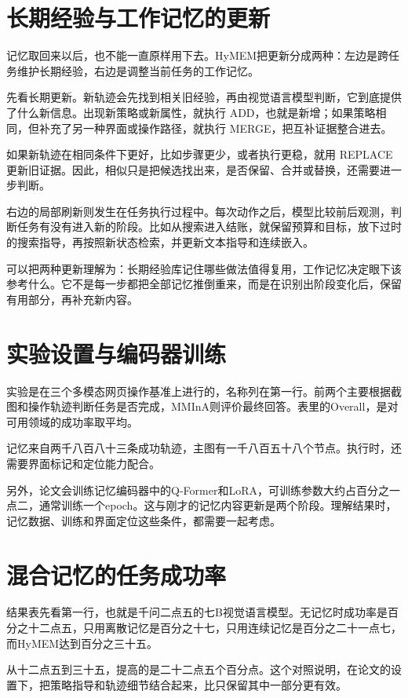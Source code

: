 \documentclass[UTF8,fontset=fandol]{ctexart}
\begin{document}
\section*{长期经验与工作记忆的更新}
记忆取回来以后，也不能一直原样用下去。HyMEM把更新分成两种：左边是跨任务维护长期经验，右边是调整当前任务的工作记忆。

先看长期更新。新轨迹会先找到相关旧经验，再由视觉语言模型判断，它到底提供了什么新信息。出现新策略或新属性，就执行 ADD，也就是新增；如果策略相同，但补充了另一种界面或操作路径，就执行 MERGE，把互补证据整合进去。

如果新轨迹在相同条件下更好，比如步骤更少，或者执行更稳，就用 REPLACE 更新旧证据。因此，相似只是把候选找出来，是否保留、合并或替换，还需要进一步判断。

右边的局部刷新则发生在任务执行过程中。每次动作之后，模型比较前后观测，判断任务有没有进入新的阶段。比如从搜索进入结账，就保留预算和目标，放下过时的搜索指导，再按照新状态检索，并更新文本指导和连续嵌入。

可以把两种更新理解为：长期经验库记住哪些做法值得复用，工作记忆决定眼下该参考什么。它不是每一步都把全部记忆推倒重来，而是在识别出阶段变化后，保留有用部分，再补充新内容。
\clearpage
{}
\section*{实验设置与编码器训练}
实验是在三个多模态网页操作基准上进行的，名称列在第一行。前两个主要根据截图和操作轨迹判断任务是否完成，MMInA则评价最终回答。表里的Overall，是对可用领域的成功率取平均。

记忆来自两千八百八十三条成功轨迹，主图有一千八百五十八个节点。执行时，还需要界面标记和定位能力配合。

另外，论文会训练记忆编码器中的Q-Former和LoRA，可训练参数大约占百分之一点二，通常训练一个epoch。这与刚才的记忆内容更新是两个阶段。理解结果时，记忆数据、训练和界面定位这些条件，都需要一起考虑。
\clearpage
{}
\section*{混合记忆的任务成功率}
结果表先看第一行，也就是千问二点五的七B视觉语言模型。无记忆时成功率是百分之十二点五，只用离散记忆是百分之十七，只用连续记忆是百分之二十一点七，而HyMEM达到百分之三十五。

从十二点五到三十五，提高的是二十二点五个百分点。这个对照说明，在论文的设置下，把策略指导和轨迹细节结合起来，比只保留其中一部分更有效。
\end{document}
